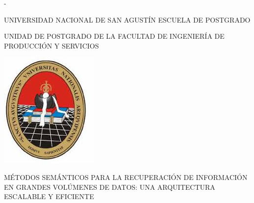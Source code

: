 %
%


% 
%
%
\begin{titlingpage}
\begin{SingleSpace}
\calccentering{\unitlength} 
\begin{adjustwidth*}{\unitlength}{-\unitlength}

\begin{center}
\fontsize{20pt}{20pt} \selectfont UNIVERSIDAD NACIONAL DE SAN AGUSTÍN 
ESCUELA DE POSTGRADO

\vspace*{1cm}
\begin{center}
{\Large UNIDAD DE POSTGRADO DE LA FACULTAD DE INGENIERÍA 
DE PRODUCCIÓN Y SERVICIOS}
\end{center}
\vspace*{1cm} 

\begin{center}
      
    
      \includegraphics[scale=0.77]{imagenes/unsaescudo.jpg}\\ 
\end{center}
      

\vspace*{1cm}
\begin{center}
{\Large MÉTODOS SEMÁNTICOS PARA LA RECUPERACIÓN DE INFORMACIÓN EN GRANDES VOLÚMENES DE DATOS: UNA ARQUITECTURA ESCALABLE Y EFICIENTE }


\end{center}
\end{center}
\end{adjustwidth*}
\end{SingleSpace}
\end{titlingpage}
